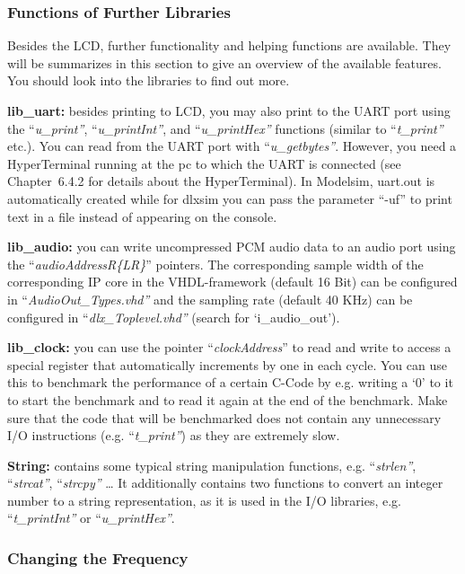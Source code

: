 \documentclass[
]{article}
\begin{document}
\hypertarget{functions-of-further-libraries}{%
\subsubsection{Functions of Further
Libraries}\label{functions-of-further-libraries}}

Besides the LCD, further functionality and helping functions are
available. They will be summarizes in this section to give an overview
of the available features. You should look into the libraries to find
out more.

\textbf{lib\_uart:} besides printing to LCD, you may also print to the
UART port using the ``\emph{u\_print''}, ``\emph{u\_printInt''}, and
``\emph{u\_printHex''} functions (similar to ``\emph{t\_print''} etc.).
You can read from the UART port with ``\emph{u\_getbytes''}. However,
you need a HyperTerminal running at the pc to which the UART is
connected (see Chapter~6.4.2 for details about the HyperTerminal). In
Modelsim, uart.out is automatically created while for dlxsim you can
pass the parameter ``-uf'' to print text in a file instead of appearing
on the console.

\textbf{lib\_audio:} you can write uncompressed PCM audio data to an
audio port using the ``\emph{audioAddressR\{L\textbar R\}}'' pointers.
The corresponding sample width of the corresponding IP core in the
VHDL-framework (default 16 Bit) can be configured in
``\emph{AudioOut\_Types.vhd''} and the sampling rate (default 40 KHz)
can be configured in ``\emph{dlx\_Toplevel.vhd''} (search for
`i\_audio\_out').

\textbf{lib\_clock:} you can use the pointer ``\emph{clockAddress}'' to
read and write to access a special register that automatically
increments by one in each cycle. You can use this to benchmark the
performance of a certain C-Code by e.g. writing a `0' to it to start the
benchmark and to read it again at the end of the benchmark. Make sure
that the code that will be benchmarked does not contain any unnecessary
I/O instructions (e.g. ``\emph{t\_print''}) as they are extremely slow.

\textbf{String:} contains some typical string manipulation functions,
e.g. ``\emph{strlen''}, ``\emph{strcat''}, ``\emph{strcpy''} \ldots{} It
additionally contains two functions to convert an integer number to a
string representation, as it is used in the I/O libraries, e.g.
``\emph{t\_printInt''} or ``\emph{u\_printHex''}.

\hypertarget{changing-the-frequency}{%
\subsubsection{\texorpdfstring{Changing the Frequency
}{Changing the Frequency }}\label{changing-the-frequency}}
\end{document}
